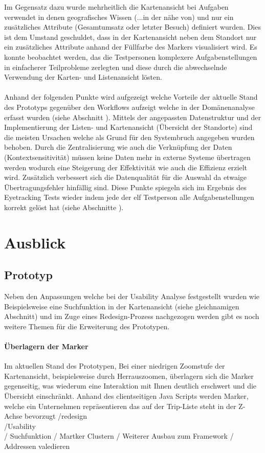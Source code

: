 \documentclass[Bachelorarbeit.tex]{subfiles}
\begin{document}
Im Gegensatz dazu wurde mehrheitlich die Kartenansicht bei Aufgaben verwendet in denen geografisches Wissen (...in der nähe von) und nur ein zusätzliches Attribute (Gesamtumsatz oder letzter Besuch) definiert wurden.
Dies ist dem Umstand geschuldet, dass in der Kartenansicht neben dem Standort nur ein zusätzliches Attribute anhand der Füllfarbe des Markers visualisiert wird.
Es konnte beobachtet werden, das die Testpersonen komplexere Aufgabenstellungen in einfacherer Teilprobleme zerlegten und diese durch die abwechselnde Verwendung der Karten- und Listenansicht lösten.\\
\\
Anhand der folgenden Punkte wird aufgezeigt welche Vorteile der aktuelle Stand des Prototyps gegenüber den Workflows aufzeigt welche in der Domänenanalyse erfasst wurden (siehe Abschnitt ).
Mittels der angepassten Datenstruktur und der Implementierung der Listen- und Kartenansicht (Übersicht der Standorte) sind die meisten Ursachen welche als Grund für den Systembruch angegeben wurden behoben.
Durch die Zentralisierung wie auch die Verknüpfung der Daten (Kontextsensitivität) müssen keine Daten mehr in externe Systeme übertragen werden wodurch eine Steigerung der Effektivität wie auch die Effizienz erzielt wird.
Zusätzlich verbessert sich die Datenqualität für die Auswahl da etwaige Übertragungsfehler hinfällig sind.
Diese Punkte spiegeln sich im Ergebnis des Eyetracking Tests wieder indem jede der elf Testperson alle Aufgabenstellungen korrekt gelöst hat (siehe Abschnitte ).

\section{Ausblick}
\label{chap:reflexion:sec:ausblick}

 

\subsection{Prototyp}
Neben den Anpassungen welche bei der Usability Analyse festgestellt wurden wie Beispielsweise eine Suchfunktion in der Kartenansicht (siehe gleichnamigen Abschnitt) und im Zuge eines Redesign-Prozess nachgezogen werden gibt es noch weitere Themen für die Erweiterung des Prototypen.

\paragraph{Überlagern der Marker}
Im aktuellen Stand des Prototypen, 
Bei einer niedrigen Zoomstufe der Kartenansicht, beispielsweise durch Herrauszoomen, überlagern sich die Marker gegenseitig, was wiederum eine Interaktion mit Ihnen deutlich erschwert und die Übersicht einschränkt.
Anhand des clientseitigen Java Scripts werden Marker, welche ein Unternehmen repräsentieren das auf der Trip-Liste steht in der Z-Achse bevorzugt
/redesign\\
/Usability\\
/ Suchfunktion
/ Martker Clustern
/ Weiterer Ausbau zum Framework
/ Addressen valedieren
\end{document}
